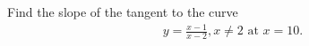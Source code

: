Find the slope of the tangent to the curve 
\begin{align}
y = \frac{x-1}{x-2}, x \ne 2 \text{ at } x = 10.
\end{align}
